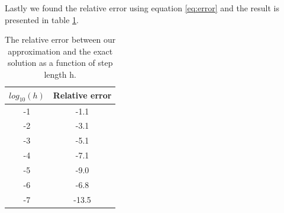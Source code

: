 \documentclass[12pt,a4paper]{article}
\begin{document}
Lastly we found the relative error using equation \eqref{eq:error} and the result is presented in table \ref{tab:error}.
\begin{table}[H]
\centering
\begin{tabular}{|c|c|} \hline
$log_{10}(h)$ & Relative error \\ \hline
-1 & -1.1 \\ \hline
-2 & -3.1 \\ \hline
-3 & -5.1 \\ \hline
-4 & -7.1 \\ \hline
-5 & -9.0 \\ \hline
-6 & -6.8 \\ \hline
-7 & -13.5  \\ \hline
\end{tabular}
\caption{The relative error between our approximation and the exact solution as a function of step length h.}
\label{tab:error}
\end{table}
\end{document}
